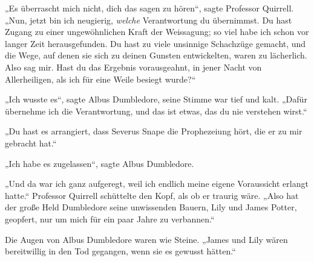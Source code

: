 „Es überrascht mich nicht, dich das sagen zu hören“, sagte Professor Quirrell.
„Nun, jetzt bin ich neugierig, \emph{welche} Verantwortung du übernimmst. Du hast Zugang zu einer ungewöhnlichen Kraft der Weissagung; so viel habe ich schon vor langer Zeit herausgefunden. Du hast zu viele unsinnige Schachzüge gemacht, und die Wege, auf denen sie sich zu deinen Gunsten entwickelten, waren zu lächerlich. Also sag mir. Hast du das Ergebnis vorausgeahnt, in jener Nacht von Allerheiligen, als ich für eine Weile besiegt wurde?“

„Ich wusste es“, sagte Albus Dumbledore, seine Stimme war tief und kalt.
„Dafür übernehme ich die Verantwortung, und das ist etwas, das du nie verstehen wirst.“

„Du hast es arrangiert, dass Severus Snape die Prophezeiung hört, die er zu mir gebracht hat.“

„Ich habe es zugelassen“, sagte Albus Dumbledore.

„Und da war ich ganz aufgeregt, weil ich endlich meine eigene Voraussicht erlangt hatte.“ Professor Quirrell schüttelte den Kopf, als ob er traurig wäre.
„Also hat der große Held Dumbledore seine unwissenden Bauern, Lily und James Potter, geopfert, nur um mich für ein paar Jahre zu verbannen.“

Die Augen von Albus Dumbledore waren wie Steine.
„James und Lily wären bereitwillig in den Tod gegangen, wenn sie es gewusst hätten.“

